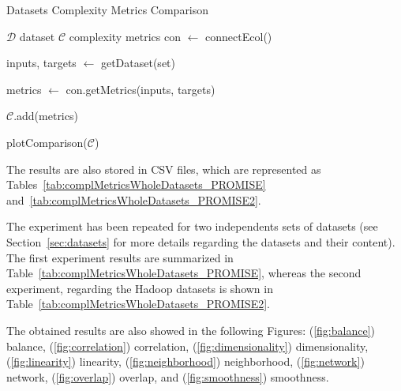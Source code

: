 \begin{breakablealgorithm}
    \caption{Datasets Complexity Metrics Comparison}
    \footnotesize
    \label{alg:complexmetrics}
    \begin{algorithmic}[1]
        \Require $\mathcal{D}$ dataset
        \Ensure $\mathcal{C}$ complexity metrics
        \State con $\leftarrow$ connectEcol()
        
        	\State inputs, targets $\leftarrow$ getDataset(set)
        	
        	\State metrics $\leftarrow$ con.getMetrics(inputs, targets)
        	
        	\State $\mathcal{C}$.add(metrics)
        \EndFor
        
    \State plotComparison($\mathcal{C}$)
    \end{algorithmic}
\end{breakablealgorithm}

The results are also stored in CSV files, which are represented
as Tables~\ref{tab:complMetricsWholeDatasets_PROMISE} 
and~\ref{tab:complMetricsWholeDatasets_PROMISE2}.

The experiment has been repeated for two independents sets of 
datasets (see Section~\ref{sec:datasets} for more details regarding
the datasets and their content). The first experiment results are
summarized in Table~\ref{tab:complMetricsWholeDatasets_PROMISE}, whereas the 
second experiment, regarding the Hadoop datasets is shown in 
Table~\ref{tab:complMetricsWholeDatasets_PROMISE2}.

The obtained results are also showed in the following Figures: 
(\ref{fig:balance}) balance, (\ref{fig:correlation}) correlation, 
(\ref{fig:dimensionality}) dimensionality, (\ref{fig:linearity}) linearity, 
(\ref{fig:neighborhood}) neighborhood, (\ref{fig:network}) network, 
(\ref{fig:overlap}) overlap, and (\ref{fig:smoothness}) smoothness.

